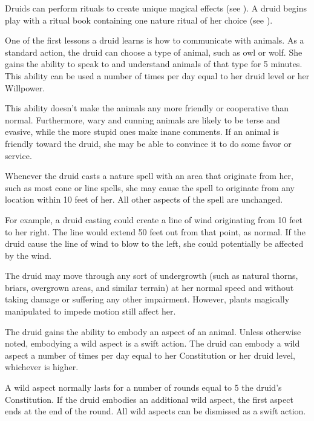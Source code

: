 Druids can perform rituals to create unique magical effects (see ).
A druid begins play with a ritual book containing one nature ritual of her choice (see ).

One of the first lessons a druid learns is how to communicate with animals.
As a standard action, the druid can choose a type of animal, such as owl or wolf.
She gains the ability to speak to and understand animals of that type for 5 minutes.
This ability can be used a number of times per day equal to her druid level or her Willpower.

This ability doesn't make the animals any more friendly or cooperative than normal.
Furthermore, wary and cunning animals are likely to be terse and evasive, while the more stupid ones make inane comments.
If an animal is friendly toward the druid, she may be able to convince it to do some favor or service.

Whenever the druid casts a nature spell with an area that originate from her, such as most cone or line spells, she may cause the spell to originate from any location within 10 feet of her.
All other aspects of the spell are unchanged.

For example, a druid casting  could create a line of wind originating from 10 feet to her right.
The line would extend 50 feet out from that point, as normal.
If the druid cause the line of wind to blow to the left, she could potentially be affected by the wind.

The druid may move through any sort of undergrowth (such as natural thorns, briars, overgrown areas, and similar terrain) at her normal speed and without taking damage or suffering any other impairment.
However, plants magically manipulated to impede motion still affect her.

The druid gains the ability to embody an aspect of an animal.
Unless otherwise noted, embodying a wild aspect is a swift action.
The druid can embody a wild aspect a number of times per day equal to her Constitution or her druid level, whichever is higher.

A wild aspect normally lasts for a number of rounds equal to 5 \add the druid's Constitution.
If the druid embodies an additional wild aspect, the first aspect ends at the end of the round.
All wild aspects can be dismissed as a swift action.

